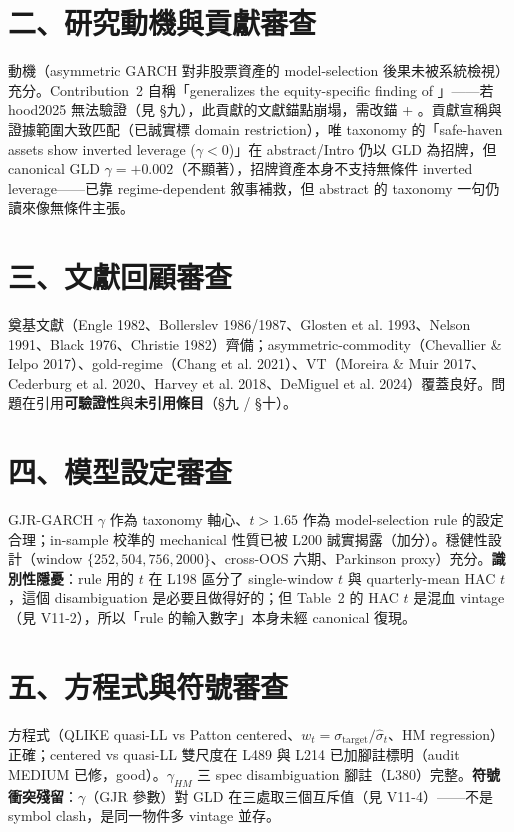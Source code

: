\documentclass[11pt,a4paper]{article}
\begin{document}
\section{二、研究動機與貢獻審查}

動機（asymmetric GARCH 對非股票資產的 model-selection 後果未被系統檢視）充分。Contribution~2 自稱「generalizes the equity-specific finding of \citet{hood2025}」——若 hood2025 無法驗證（見 §九），此貢獻的文獻錨點崩塌，需改錨 \citet{moreira2017} + \citet{harvey2018}。貢獻宣稱與證據範圍大致匹配（已誠實標 domain restriction），唯 taxonomy 的「safe-haven assets show inverted leverage ($\gamma<0$)」在 abstract/Intro 仍以 GLD 為招牌，但 canonical GLD $\gamma=+0.002$（不顯著），招牌資產本身不支持無條件 inverted leverage——已靠 regime-dependent 敘事補救，但 abstract 的 taxonomy 一句仍讀來像無條件主張。

\section{三、文獻回顧審查}

奠基文獻（Engle 1982、Bollerslev 1986/1987、Glosten et al. 1993、Nelson 1991、Black 1976、Christie 1982）齊備；asymmetric-commodity（Chevallier \& Ielpo 2017）、gold-regime（Chang et al. 2021）、VT（Moreira \& Muir 2017、Cederburg et al. 2020、Harvey et al. 2018、DeMiguel et al. 2024）覆蓋良好。問題在引用\textbf{可驗證性}與\textbf{未引用條目}（§九 / §十）。

\section{四、模型設定審查}

GJR-GARCH $\gamma$ 作為 taxonomy 軸心、$t>1.65$ 作為 model-selection rule 的設定合理；in-sample 校準的 mechanical 性質已被 L200 誠實揭露（加分）。穩健性設計（window $\{252,504,756,2000\}$、cross-OOS 六期、Parkinson proxy）充分。\textbf{識別性隱憂}：rule 用的 $t$ 在 L198 區分了 single-window $t$ 與 quarterly-mean HAC $t$，這個 disambiguation 是必要且做得好的；但 Table~2 的 HAC $t$ 是混血 vintage（見 V11-2），所以「rule 的輸入數字」本身未經 canonical 復現。

\section{五、方程式與符號審查}

方程式（QLIKE quasi-LL vs Patton centered、$w_t=\sigma_{\text{target}}/\hat\sigma_t$、HM regression）正確；centered vs quasi-LL 雙尺度在 L489 與 L214 已加腳註標明（audit MEDIUM 已修，good）。$\gamma_{HM}$ 三 spec disambiguation 腳註（L380）完整。\textbf{符號衝突殘留}：$\gamma$（GJR 參數）對 GLD 在三處取三個互斥值（見 V11-4）——不是 symbol clash，是同一物件多 vintage 並存。
\end{document}
